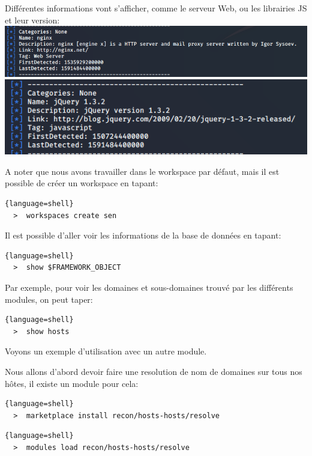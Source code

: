 Différentes informations vont s'afficher, comme le serveur Web, ou les librairies JS et leur version: \\

\includegraphics[scale=0.48]{images/SEN_Projet_Image019.png} \\

\includegraphics[scale=0.48]{images/SEN_Projet_Image020.png}

A noter que nous avons travailler dans le workspace par défaut, mais il est possible de créer un workspace en tapant:

\begin{lstlisting}{language=shell}
  >  workspaces create sen
\end{lstlisting}

Il est possible d'aller voir les informations de la base de données en tapant:

\begin{lstlisting}{language=shell}
  >  show $FRAMEWORK_OBJECT
\end{lstlisting}

Par exemple, pour voir les domaines et sous-domaines trouvé par les différents modules, on peut taper:

\begin{lstlisting}{language=shell}
  >  show hosts
\end{lstlisting}

Voyons un exemple d'utilisation avec un autre module.

Nous allons d'abord devoir faire une resolution de nom de domaines sur tous nos hôtes, il existe un module pour cela:

\begin{lstlisting}{language=shell}
  >  marketplace install recon/hosts-hosts/resolve
\end{lstlisting}

\begin{lstlisting}{language=shell}
  >  modules load recon/hosts-hosts/resolve
\end{lstlisting}

